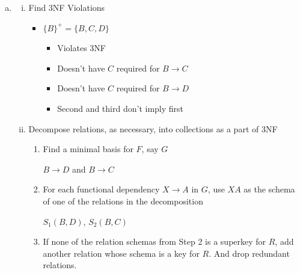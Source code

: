 \documentclass[12pt]{article}
\begin{document}
\begin{enumerate}[1.]
\begin{enumerate}[a)]
        \item

        \begin{enumerate}[i)]
            \item Find 3NF Violations

            \bigskip

            \color{red}
            \begin{itemize}
                \item $\{B\}^+ = \{B,C,D\}$
                \begin{itemize}
                    \item Violates 3NF
                    \item Doesn't have $C$ required for $B \to C$
                    \item Doesn't have $C$ required for $B \to D$
                    \item Second and third don't imply first
                \end{itemize}
            \end{itemize}
            \color{black}

            \item Decompose relations, as necessary, into collections as a part of 3NF

            \bigskip

            \begin{enumerate}[1.]
                \item Find a minimal basis for $F$, say $G$

                \bigskip

                \color{red}
                $B \to D$ and $B \to C$
                \color{black}

                \bigskip

                \item For each functional dependency $X \to A$ in $G$, use $XA$
                as the schema of one of the relations in the decomposition

                \bigskip

                \color{red}
                $S_1(B,D)$, $S_2(B,C)$
                \color{black}

                \bigskip

                \item If none of the relation schemas from Step 2 is a superkey for $R$,
                add another relation whose schema is a key for $R$. And drop redundant relations.


\end{enumerate}
\end{enumerate}
\end{enumerate}
\end{enumerate}
\end{document}

